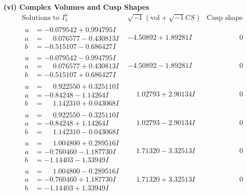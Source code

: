 \documentclass[1p]{elsarticle_modified}
\theoremstyle{definition}
\newcommand{\I}{\sqrt{-1}}
\begin{document}
\newpage\flushleft \textbf{(vi) Complex Volumes and Cusp Shapes}
$$\begin{array}{c|c|c}  
\text{Solutions to }I^u_{1}& \I (\text{vol} + \sqrt{-1}CS) & \text{Cusp shape}\\
 \hline 
\begin{aligned}
u &= -0.079542 + 0.994795 I \\
a &= \phantom{-}0.076577 - 0.430813 I \\
b &= -0.515107 - 0.686427 I\end{aligned}
 & -4.50892 + 1.89281 I & \phantom{-0.000000 } 0 \\ \hline\begin{aligned}
u &= -0.079542 - 0.994795 I \\
a &= \phantom{-}0.076577 + 0.430813 I \\
b &= -0.515107 + 0.686427 I\end{aligned}
 & -4.50892 - 1.89281 I & \phantom{-0.000000 } 0 \\ \hline\begin{aligned}
u &= \phantom{-}0.922550 + 0.325110 I \\
a &= -0.84248 - 1.14264 I \\
b &= \phantom{-}1.142310 + 0.043068 I\end{aligned}
 & \phantom{-}1.02793 + 2.90134 I & \phantom{-0.000000 } 0 \\ \hline\begin{aligned}
u &= \phantom{-}0.922550 - 0.325110 I \\
a &= -0.84248 + 1.14264 I \\
b &= \phantom{-}1.142310 - 0.043068 I\end{aligned}
 & \phantom{-}1.02793 - 2.90134 I & \phantom{-0.000000 } 0 \\ \hline\begin{aligned}
u &= \phantom{-}1.004800 + 0.289516 I \\
a &= -0.760460 - 1.187730 I \\
b &= -1.14403 - 1.33949 I\end{aligned}
 & \phantom{-}1.71320 - 3.32513 I & \phantom{-0.000000 } 0 \\ \hline\begin{aligned}
u &= \phantom{-}1.004800 - 0.289516 I \\
a &= -0.760460 + 1.187730 I \\
b &= -1.14403 + 1.33949 I\end{aligned}
 & \phantom{-}1.71320 + 3.32513 I & \phantom{-0.000000 } 0 \\ \hline\begin{aligned}

\end{aligned}
\end{array}$$
\end{document}
